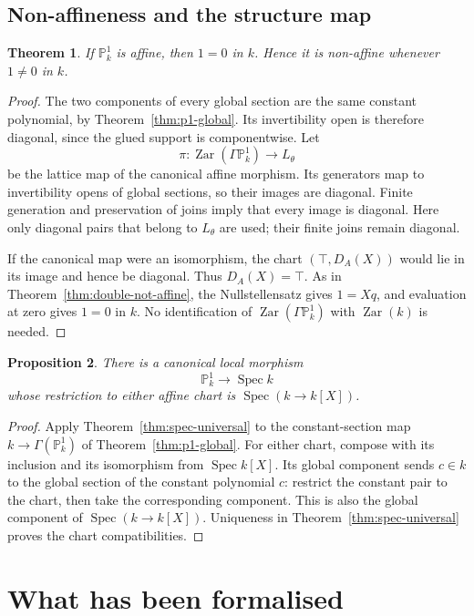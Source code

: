 \documentclass[11pt]{amsart}
\newtheorem{theorem}{Theorem}[section]
\newtheorem{proposition}[theorem]{Proposition}
\theoremstyle{definition}
\theoremstyle{remark}
\newcommand{\Zar}{\operatorname{Zar}}
\newcommand{\Spec}{\operatorname{Spec}}
\begin{document}
\subsection{Non-affineness and the structure map}

\begin{theorem}\label{thm:p1-not-affine}
If $\mathbb P^1_k$ is affine, then $1=0$ in $k$. Hence it is non-affine
whenever $1\ne0$ in $k$.
\end{theorem}
\begin{proof}
The two components of every global section are the same constant
polynomial, by Theorem~\ref{thm:p1-global}. Its invertibility open is
therefore diagonal, since the glued support is componentwise.
Let
\[
 \pi:\Zar(\Gamma\mathbb P^1_k)\longrightarrow L_\theta
\]
be the lattice map of the canonical affine morphism. Its generators map
to invertibility opens of global sections, so their images are diagonal.
Finite generation and preservation of joins imply that every image is
diagonal. Here only diagonal pairs that belong to $L_\theta$ are used;
their finite joins remain diagonal.

If the canonical map were an isomorphism, the chart
$(\top,D_A(X))$ would lie in its image and hence be diagonal. Thus
$D_A(X)=\top$. As in Theorem~\ref{thm:double-not-affine}, the
Nullstellensatz gives $1=Xq$, and evaluation at zero gives $1=0$ in
$k$. No identification of $\Zar(\Gamma\mathbb P^1_k)$ with $\Zar(k)$
is needed.
\end{proof}

\begin{proposition}\label{prop:p1-structure}
There is a canonical local morphism
\[
 \mathbb P^1_k\longrightarrow\Spec k
\]
whose restriction to either affine chart is $\Spec(k\to k[X])$.
\end{proposition}
\begin{proof}
Apply Theorem~\ref{thm:spec-universal} to the constant-section map
$k\to\Gamma(\mathbb P^1_k)$ of Theorem~\ref{thm:p1-global}.
For either chart, compose with its inclusion and its isomorphism from
$\Spec k[X]$. Its global component sends $c\in k$ to the global
section of the constant polynomial $c$: restrict the constant pair to
the chart, then take the corresponding component. This is also the
global component of $\Spec(k\to k[X])$. Uniqueness in
Theorem~\ref{thm:spec-universal} proves the chart compatibilities.
\end{proof}

\section{What has been formalised}
\end{document}
